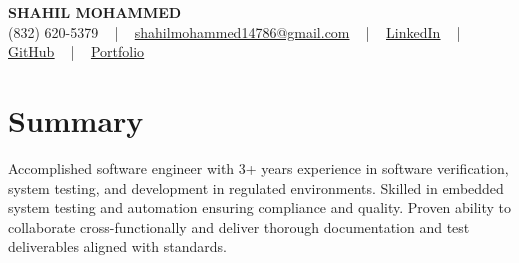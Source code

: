 \documentclass[letterpaper,10pt]{article}
\begin{document}
\begin{center}
    {\fontsize{14pt}{12pt}\selectfont \textbf{\MakeUppercase{Shahil Mohammed}}}\\ \vspace{2pt}
    \fontsize{10pt}{12pt}\selectfont (832) 620-5379 ~ | ~ \href{mailto:shahilmohammed14786@gmail.com}{shahilmohammed14786@gmail.com} ~ | ~  
    \href{https://www.linkedin.com/in/shahil-mohammed-9652931a1/}{\color{blue}\underline{LinkedIn}}  ~ | ~ 
    \href{https://github.com/freakbeast14}{\color{blue}\underline{GitHub}} ~ | ~ 
    \href{https://shahil-mohammed.netlify.app/}{\color{blue}\underline{Portfolio}}
    \vspace{-8pt}
\end{center}

\section{Summary}
\vspace{-2pt}\fontsize{8pt}{9pt}\selectfont
Accomplished software engineer with 3+ years experience in software verification, system testing, and development in regulated environments. Skilled in embedded system testing and automation ensuring compliance and quality. Proven ability to collaborate cross-functionally and deliver thorough documentation and test deliverables aligned with standards.
 \vspace{-5pt}
 
\vspace{-2pt}
\end{document}

